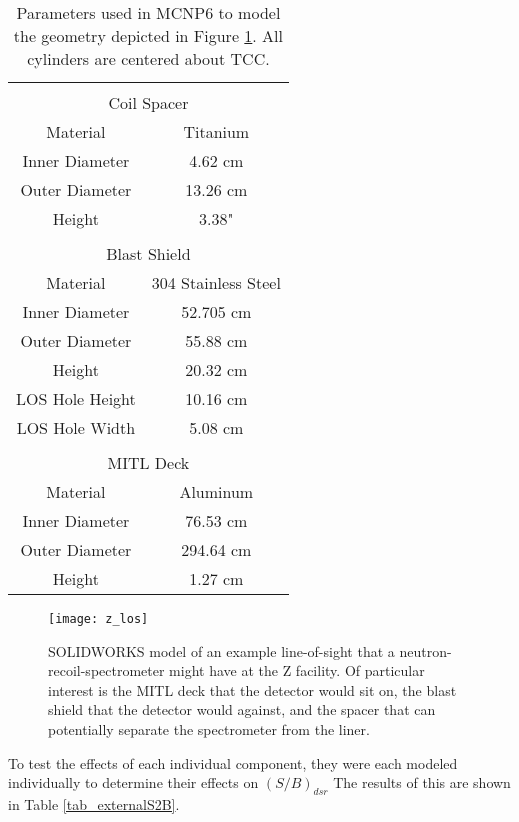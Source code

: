 \begin{table}[!h]
	\caption{Parameters used in MCNP6 to model the geometry depicted in Figure \ref{fig_z_los}. All cylinders are centered about TCC.  }
	\label{tab_externalParameters}
	\renewcommand{\arraystretch}{1.2} 
	\begin{tabular}{  c c  }
		&\\
		\multicolumn{2}{c}{Coil Spacer} \\\hline
		Material & Titanium \\
		Inner Diameter & 4.62 cm \\		%
		Outer Diameter	& 13.26 cm \\	%
		Height	& 3.38" \\				%
		&\\
		\multicolumn{2}{c}{Blast Shield} \\\hline
		Material & 304 Stainless Steel \\
		Inner Diameter & 52.705 cm \\
		Outer Diameter	& 55.88 cm \\
		Height	& 20.32 cm \\
		LOS Hole Height & 10.16 cm \\
		LOS Hole Width & 5.08 cm \\
		&\\
		\multicolumn{2}{c}{MITL Deck} \\\hline
		Material & Aluminum \\
		Inner Diameter & 76.53 cm \\
		Outer Diameter	& 294.64 cm \\
		Height	& 1.27 cm \\
	\end{tabular}		
\end{table}

\begin{figure}[h!]
	
	\centering
	\texttt{[image: z\_los]}
	\caption{SOLIDWORKS model of an example line-of-sight that a neutron-recoil-spectrometer might have at the Z facility. Of particular interest is the MITL deck that the detector would sit on, the blast shield that the detector would against, and the spacer that can potentially separate the spectrometer from the liner.}
	\label{fig_z_los}
	
\end{figure}



To test the effects of each individual component, they were each modeled individually to determine their effects on $(S/B)_{dsr}$ The results of this are shown in Table \ref{tab_externalS2B}.

